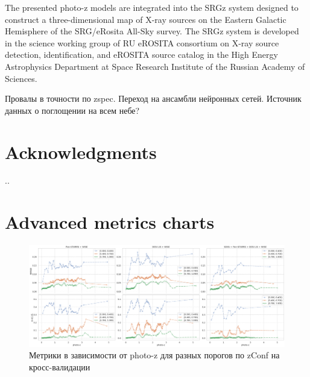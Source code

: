 \documentclass[fleqn,usenatbib]{mnras}
\begin{document}
The presented photo-z models are integrated into the SRGz system designed to construct a three-dimensional map of X-ray sources on the Eastern Galactic Hemisphere of the SRG/eRosita All-Sky survey. The SRGz system is developed in the science working group of RU eROSITA consortium on X-ray source detection, identification, and eROSITA source catalog in the High Energy Astrophysics Department at Space Research Institute of the Russian Academy of Sciences.


Провалы в точности по zspec. Переход на ансамбли нейронных сетей. Источник данных о поглощении на всем небе?

\section*{Acknowledgments}
..




\appendix

\section{Advanced metrics charts}

\begin{landscape}
\begin{figure}
    \centering
    \includegraphics[width=25cm]{images/metrics-adv-photoz-x-zconf-cv2.png}
    \caption{Метрики в зависимости от photo-z для разных порогов по zConf на кросс-валидации}
    \label{fig:my_label}
\end{figure}
\end{landscape}
\end{document}
